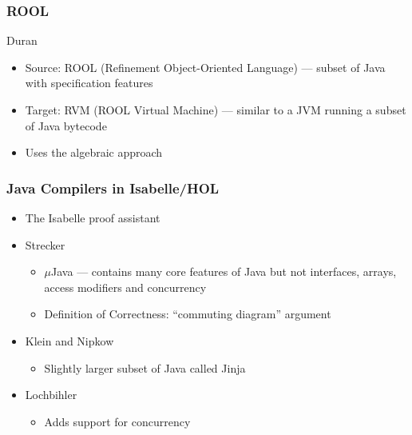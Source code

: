\documentclass[usenames,dvipsnames,svgnames,table]{beamer}
\newcommand{\footmake}[1]{
\ifthenelse{\equal{#1}{}}%
	{}%
	{\footnotetext{#1}}%
}
\newenvironment{slide}[2][fragile,environment=slide]
{\begin{frame}[#1]
	\frametitle{#2}\begin{refsegment}}
{\footmake{\printbibliography[segment=\therefsegment]}\end{refsegment}\end{frame}}
\begin{document}
\begin{slide}{ROOL}
  \scriptsize
  Duran\cite{duran2005, duran2010}
  \begin{itemize}
  \item Source: ROOL (Refinement Object-Oriented Language)\cite{cavalcanti2000} --- subset of Java with specification features
  \item Target: RVM (ROOL Virtual Machine) --- similar to a JVM running a subset of Java bytecode
  \item Uses the algebraic approach
  \end{itemize}
  \begin{center}
  \end{center}
\end{slide}

\begin{slide}{Java Compilers in Isabelle/HOL}
  \begin{itemize}
  \item The Isabelle proof assistant\cite{nipkow2014}
  \item Strecker\cite{strecker2002}
    \begin{itemize}
    \item $\mu$Java\cite{nipkow2000} --- contains many core features of Java but not interfaces, arrays, access modifiers and concurrency
    \item Definition of Correctness: ``commuting diagram'' argument
    \end{itemize}
  \item Klein and Nipkow\cite{klein2006}
    \begin{itemize}
    \item Slightly larger subset of Java called Jinja
    \end{itemize}
  \item Lochbihler\cite{lochbihler2010}
    \begin{itemize}
    \item Adds support for concurrency
    \end{itemize}
  \end{itemize}
\end{slide}
\end{document}
